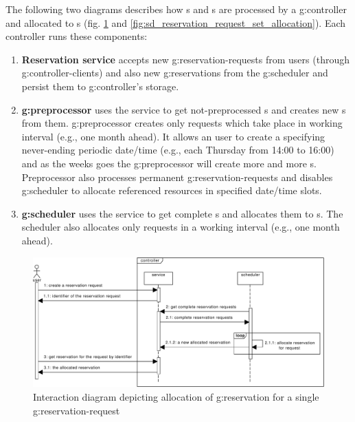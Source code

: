 The following two diagrams describes how s and s are processed by a \gls{g:controller} and allocated to s (fig. \ref{fig:sd_reservation_request_allocation} and \ref{fig:sd_reservation_request_set_allocation}). Each controller runs these components:
\begin{enumerate}
\item \textbf{Reservation service} accepts new \glspl{g:reservation-request} from users (through \glspl{g:controller-client}) and also new \glspl{g:reservation} from the \gls{g:scheduler} and persist them to \gls{g:controller}'s storage.
\item \textbf{\Gls{g:preprocessor}} uses the service to get not-preprocessed s and creates new s from them. \Gls{g:preprocessor} creates only requests which take place in working interval (e.g., one month ahead). It allows an user to create a  specifying never-ending periodic date/time (e.g., each Thursday from 14:00 to 16:00) and as the weeks goes the \gls{g:preprocessor} will create more and more s. Preprocessor also processes permanent \glspl{g:reservation-request} and disables \gls{g:scheduler} to allocate referenced resources in specified date/time slots.
\item \textbf{\Gls{g:scheduler}} uses the service to get complete s and allocates them to s. The scheduler also allocates only requests in a working interval (e.g., one month ahead).
\end{enumerate}

\begin{figure}[ht!]
\includegraphics[width=\textwidth]{diagrams/sd_reservation_request_allocation}
\caption{Interaction diagram depicting allocation of \gls{g:reservation} for a single \gls{g:reservation-request}}
\label{fig:sd_reservation_request_allocation}
\end{figure}

